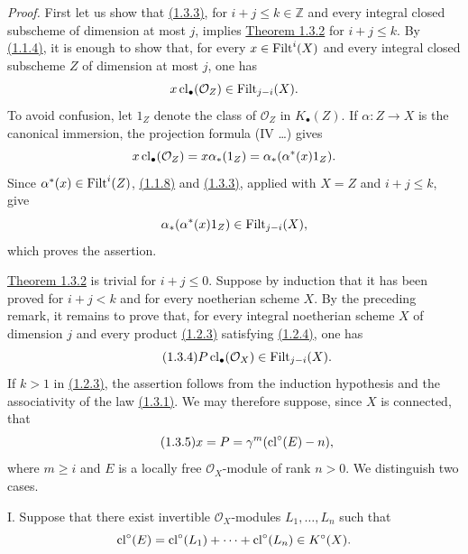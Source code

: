 \emph{Proof.}
First let us show that \hyperlink{sga6.e10.cor.1-3-3}{(1.3.3)}, for $i+j\leq k\in\mathbb Z$ and every integral
closed subscheme of dimension at most $j$, implies \hyperlink{sga6.e10.thm.1-3-2}{Theorem 1.3.2} for
$i+j\leq k$. By \hyperlink{sga6.e10.cor.1-1-4}{(1.1.4)}, it is enough to show that, for every
$x\in\operatorname{Filt}^i(X)$ and every integral closed subscheme $Z$ of dimension at most
$j$, one has
\[
x\operatorname{cl}_\bullet(\mathcal O_Z)\in\operatorname{Filt}_{j-i}(X).
\]
To avoid confusion, let $1_Z$ denote the class of $\mathcal O_Z$ in
$K_\bullet(Z)$. If $\alpha:Z\to X$ is the canonical immersion, the projection
formula (IV \ldots) gives
\[
x\operatorname{cl}_\bullet(\mathcal O_Z)
=x\alpha_*(1_Z)
=\alpha_*(\alpha^*(x)1_Z).
\]
Since $\alpha^*(x)\in\operatorname{Filt}^i(Z)$, \hyperlink{sga6.e10.prop.1-1-8}{(1.1.8)} and \hyperlink{sga6.e10.cor.1-3-3}{(1.3.3)}, applied with $X=Z$
and $i+j\leq k$, give
\[
\alpha_*(\alpha^*(x)1_Z)\in\operatorname{Filt}_{j-i}(X),
\]
which proves the assertion.

\hyperlink{sga6.e10.thm.1-3-2}{Theorem 1.3.2} is trivial for $i+j\leq0$. Suppose by induction that it has been
proved for $i+j<k$ and for every noetherian scheme $X$. By the preceding
remark, it remains to prove that, for every integral noetherian scheme $X$ of
dimension $j$ and every product \hyperlink{sga6.e10.eq.1-2-3}{(1.2.3)} satisfying \hyperlink{sga6.e10.eq.1-2-4}{(1.2.4)}, one has
\begin{equation}\tag{1.3.4}
P\operatorname{cl}_\bullet(\mathcal O_X)\in\operatorname{Filt}_{j-i}(X).
\end{equation}
If $k>1$ in \hyperlink{sga6.e10.eq.1-2-3}{(1.2.3)}, the assertion follows from the induction hypothesis and
the associativity of the law \hyperlink{sga6.e10.eq.1-3-1}{(1.3.1)}. We may therefore suppose, since $X$ is
connected, that
\begin{equation}\tag{1.3.5}
x=P=\gamma^m(\operatorname{cl}^\circ(E)-n),
\end{equation}
where $m\geq i$ and $E$ is a locally free $\mathcal O_X$-module of rank
$n>0$. We distinguish two cases.

I. Suppose that there exist invertible $\mathcal O_X$-modules
$L_1,\ldots,L_n$ such that
\[
\operatorname{cl}^\circ(E)=\operatorname{cl}^\circ(L_1)+\cdots+\operatorname{cl}^\circ(L_n)\in K^\circ(X).
\]

